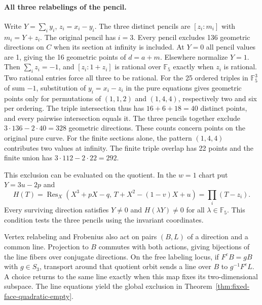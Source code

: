 \paragraph{All three relabelings of the pencil.}
Write \(Y=\sum_i y_i\), \(z_i=x_i-y_i\). The three distinct pencils
are \([z_i:m_i]\) with \(m_i=Y+z_i\). The original pencil has
\(i=3\). Every pencil excludes 136 geometric directions on \(C\)
when its section at infinity is included. At \(Y=0\) all pencil values
are 1, giving the 16 geometric points of \(d=a+m\).
Elsewhere normalize \(Y=1\). Then \(\sum_i z_i=-1\), and \([z_i:1+z_i]\)
is rational over \(\mathbb F_5\) exactly when \(z_i\) is rational.
Two rational entries force all three to be rational. For the 25
ordered triples in \(\mathbb F_5^3\) of sum \(-1\), substitution of
\(y_i=x_i-z_i\) in the pure equations gives geometric points only
for permutations of \((1,1,2)\) and \((1,4,4)\), respectively two and
six per ordering. The triple intersection thus has \(16+6+18=40\)
distinct points, and every pairwise intersection equals it. The three
pencils together exclude \(3\cdot136-2\cdot40=328\) geometric
directions. These counts concern points on the original pure curve.
For the finite sections alone, the pattern \((1,4,4)\) contributes
two values at infinity. The finite triple overlap has 22 points and
the finite union has \(3\cdot112-2\cdot22=292\).

This exclusion can be evaluated on the quotient. In the \(w=1\) chart
put \(Y=3u-2p\) and
\[
 H(T)=\operatorname{Res}_X\!\left(X^3+pX-q,\,
             T+X^2-(1-v)X+u\right)=\prod_i(T-z_i).
\]
Every surviving direction satisfies \(Y\ne0\) and
\(H(\lambda Y)\ne0\) for all \(\lambda\in\mathbb F_5\).
This condition tests the three pencils using the invariant coordinates.

Vertex relabeling and Frobenius also act on pairs \((B,L)\) of a
direction and a common line. Projection to \(B\) commutes with both
actions, giving bijections of the line fibers over conjugate directions.
On the free labeling locus, if \(F^e B=gB\) with \(g\in S_3\),
transport around that quotient orbit sends a line over \(B\) to
\(g^{-1}F^eL\). A choice returns to the same line exactly when this
map fixes its two-dimensional subspace. The line equations yield the
global exclusion in Theorem~\ref{thm:fixed-face-quadratic-empty}.
